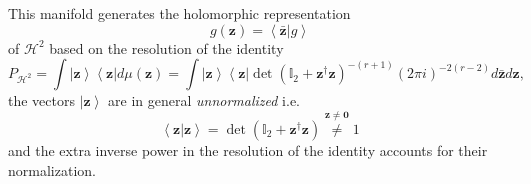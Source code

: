 \documentclass[aps,preprint]{revtex4}%
\begin{document}
This manifold generates the holomorphic representation
\begin{equation}
g\left(  \mathbf{z}\right)  =\left\langle \mathbf{\bar{z}}\left\vert g\right.
\right\rangle
\end{equation}
of $\mathcal{H}^{2}$ based on the resolution of the identity
\cite{Blaiz&Orland}
\begin{equation}
P_{\mathcal{H}^{2}}=\int\left\vert \mathbf{z}\right\rangle \left\langle
\mathbf{z}\right\vert d\mu\left(  \mathbf{z}\right)  =\int\left\vert
\mathbf{z}\right\rangle \left\langle \mathbf{z}\right\vert \det\left(
\mathbb{I}_{2}+\mathbf{z}^{\dagger}\mathbf{z}\right)  ^{-\left(  r+1\right)
}\left(  2\pi i\right)  ^{-2\left(  r-2\right)  }d\mathbf{\bar{z}}d\mathbf{z},
\end{equation}
the vectors $\left\vert \mathbf{z}\right\rangle $ are in general
\emph{unnormalized} i.e.%
\begin{equation}
\left\langle \mathbf{z}\left\vert \mathbf{z}\right.  \right\rangle
=\det\left(  \mathbb{I}_{2}+\mathbf{z}^{\dagger}\mathbf{z}\right)
\overset{\mathbf{z\neq0}}{\neq}1
\end{equation}
and the extra inverse power in the resolution of the identity accounts for
their normalization.
\end{document}
